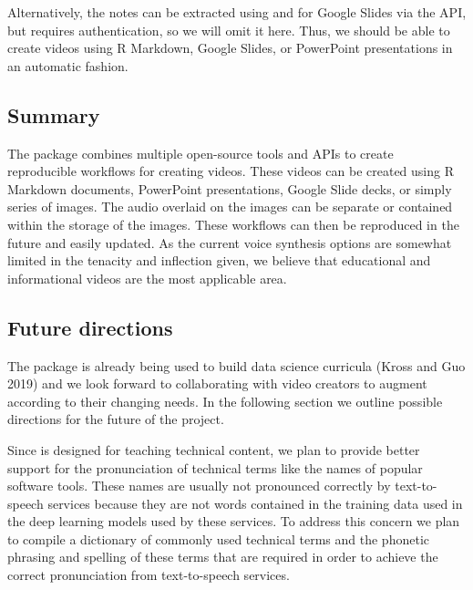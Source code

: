 Alternatively, the notes can be extracted using  and
for Google Slides via the API, but requires authentication, so we will
omit it here. Thus, we should be able to create videos using R Markdown,
Google Slides, or PowerPoint presentations in an automatic fashion.

\hypertarget{summary}{%
\subsection{Summary}\label{summary}}

The  package combines multiple open-source tools and APIs to
create reproducible workflows for creating videos. These videos can be
created using R Markdown documents, PowerPoint presentations, Google
Slide decks, or simply series of images. The audio overlaid on the
images can be separate or contained within the storage of the images.
These workflows can then be reproduced in the future and easily updated.
As the current voice synthesis options are somewhat limited in the
tenacity and inflection given, we believe that educational and
informational videos are the most applicable area.

\hypertarget{future-directions}{%
\subsection{Future directions}\label{future-directions}}

The  package is already being used to build data science
curricula (Kross and Guo 2019) and we look forward to collaborating with
video creators to augment  according to their changing needs.
In the following section we outline possible directions for the future
of the project.

Since  is designed for teaching technical content, we plan to
provide better support for the pronunciation of technical terms like the
names of popular software tools. These names are usually not pronounced
correctly by text-to-speech services because they are not words
contained in the training data used in the deep learning models used by
these services. To address this concern we plan to compile a dictionary
of commonly used technical terms and the phonetic phrasing and spelling
of these terms that are required in order to achieve the correct
pronunciation from text-to-speech services.

